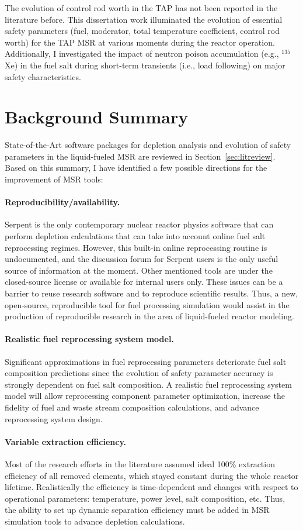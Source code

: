 The evolution of control rod worth in the \gls{TAP} has not been reported in 
the literature before. This dissertation work illuminated the evolution of  
essential safety parameters (fuel, moderator, total temperature coefficient, 
control rod worth) for the \gls{TAP} \gls{MSR} at various moments 
during the reactor operation. Additionally, I investigated the impact of 
neutron poison accumulation (e.g., $^{135}$Xe) in the fuel salt during 
short-term transients (i.e., load following) on major safety characteristics.


\section{Background Summary}
State-of-the-Art software packages for depletion analysis and evolution of 
safety parameters in the liquid-fueled \gls{MSR} are reviewed in 
Section~\ref{sec:litreview}. Based on this summary, I have identified a few 
possible directions for the improvement of \gls{MSR} tools:
\paragraph{Reproducibility/availability.}
Serpent is the only contemporary nuclear reactor physics software that can 
perform depletion calculations that can take into account online fuel salt 
reprocessing regimes. However, this built-in online reprocessing routine is 
undocumented, and the discussion forum for Serpent users is the only useful 
source of information at the moment. Other mentioned tools are under the 
closed-source license or available for internal users only. These issues can 
be a barrier to reuse research software and to reproduce scientific results. 
Thus, a new, open-source, reproducible tool for fuel processing 
simulation would assist in the production of reproducible research in the area 
of liquid-fueled reactor modeling.
\paragraph{Realistic fuel reprocessing system model.} 
Significant approximations in fuel reprocessing parameters deteriorate fuel 
salt composition predictions since the evolution of safety parameter accuracy 
is strongly dependent on fuel salt composition. A realistic fuel reprocessing 
system model will allow reprocessing component parameter optimization,  
increase the fidelity of fuel and waste stream composition calculations, and 
advance reprocessing system design.
\paragraph{Variable extraction efficiency.} Most of the research efforts in 
the literature assumed ideal 100\% extraction efficiency of all removed 
elements, which stayed constant during the whole reactor lifetime. 
Realistically the efficiency is time-dependent and changes with respect to 
operational parameters: temperature, power level, salt composition, etc. Thus, 
the ability to set up dynamic separation efficiency must be added in \gls{MSR} 
simulation tools to advance depletion calculations.
